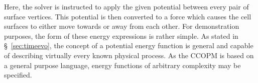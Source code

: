 \documentclass[12pt]{article}
\begin{document}
Here, the solver is instructed to apply the given potential between every pair of surface vertices. This potential is then converted to a force which causes the cell surfaces to either move towards or away from each other.
For demonstration purposes, the form of these energy expressions is rather simple. As stated in \S~\ref{sec:timeevo}, the concept of a potential energy function is general and capable of describing virtually every known physical process. As the CCOPM is based on a general purpose language, energy functions of arbitrary complexity may be specified.
\end{document}
